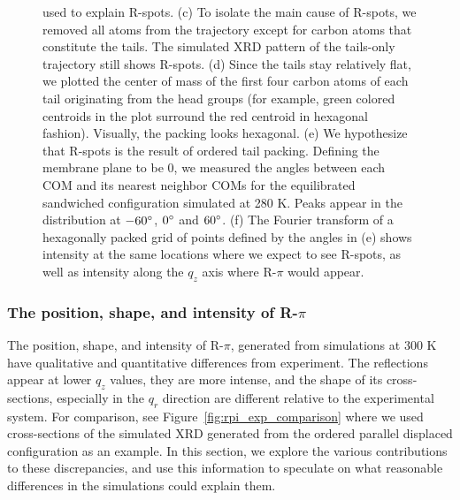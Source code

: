 \documentclass[journal=jpcbfk,manuscript=article]{achemso}
\begin{document}
\begin{figure}[!htb]
{	  used to explain R-spots. (c) To isolate the main cause of R-spots, we removed
	  all atoms from the trajectory except for carbon atoms that constitute the
	  tails. The simulated XRD pattern of the tails-only trajectory still shows
	  R-spots. (d) Since the tails stay relatively flat, we plotted the center of
	  mass of the first four carbon atoms of each tail originating from the head
	  groups (for example, green colored centroids in the plot surround the red
	  centroid in hexagonal fashion).  Visually, the packing looks hexagonal. (e) We
	  hypothesize that R-spots is the result of ordered tail packing. Defining the
	  membrane plane to be 0\degree, we measured the angles between each COM and its
	  nearest neighbor COMs for the equilibrated sandwiched configuration simulated
	  at 280 K. Peaks appear in the distribution at $-60\degree$, $0\degree$ and
	  $60\degree$. (f) The Fourier transform of a hexagonally packed grid of points
	  defined by the angles in (e) shows intensity at the same locations where we
	  expect to see R-spots, as well as intensity along the $q_z$ axis
          where R-$\pi$ would appear.}~\label{fig:tail_packing}
  \end{figure}  

  \subsubsection{The position, shape, and intensity of R-$\pi$}\label{section:rpi}

  The position, shape, and intensity of R-$\pi$, generated from simulations at
  300 K have qualitative and quantitative differences from experiment. The
  reflections appear at lower $q_z$ values, they are more intense, and the shape
  of its cross-sections, especially in the $q_r$ direction are different relative
  to the experimental system. For comparison, see
  Figure~\ref{fig:rpi_exp_comparison} where we used cross-sections of the
  simulated XRD generated from the ordered parallel displaced configuration as an
  example. In this section, we explore the various contributions to these
  discrepancies, and use this information to speculate on what reasonable
  differences in the simulations could explain them.
  
\end{document}
